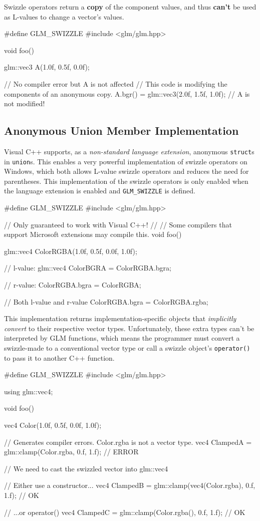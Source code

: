 \documentclass{scrartcl}
\numberwithin{figure}{subsection}
\begin{document}
Swizzle operators return a \textbf{copy} of the component values, and thus \textbf{can't} be used as L-values to change a vector's values.

\begin{cppcode}
#define GLM_SWIZZLE 
#include <glm/glm.hpp>

void foo()
{
  glm::vec3 A(1.0f, 0.5f, 0.0f);

  // No compiler error but A is not affected
  // This code is modifying the components of an anonymous copy.
  A.bgr() = glm::vec3(2.0f, 1.5f, 1.0f); // A is not modified!
}
\end{cppcode}


\subsection{Anonymous Union Member Implementation}

Visual C++ supports, as a \emph{non-standard language extension}, anonymous \verb|struct|s in \verb|union|s. This enables a very powerful implementation of swizzle operators on Windows, which both allows L-value swizzle operators and reduces the need for parentheses.  This implementation of the swizzle operators is only enabled when the language extension is enabled and \verb|GLM_SWIZZLE| is defined.

\begin{cppcode}
#define GLM_SWIZZLE 
#include <glm/glm.hpp>

// Only guaranteed to work with Visual C++!
//
// Some compilers that support Microsoft extensions may compile this.
void foo()
{
  glm::vec4 ColorRGBA(1.0f, 0.5f, 0.0f, 1.0f);

  // l-value:
  glm::vec4 ColorBGRA = ColorRGBA.bgra;

  // r-value:
  ColorRGBA.bgra = ColorRGBA;

  // Both l-value and r-value
  ColorRGBA.bgra = ColorRGBA.rgba;
}
\end{cppcode}

This implementation returns implementation-specific objects that \emph{implicitly convert} to their respective vector types.  Unfortunately, these extra types can't be interpreted by GLM functions, which means the programmer must convert a swizzle-made  to a conventional vector type or call a swizzle object's \verb|operator()| to pass it to another C++ function.

\begin{cppcode}
#define GLM_SWIZZLE 
#include <glm/glm.hpp>

using glm::vec4;

void foo()
{
  vec4 Color(1.0f, 0.5f, 0.0f, 1.0f);

  // Generates compiler errors. Color.rgba is not a vector type.
  vec4 ClampedA = glm::clamp(Color.rgba, 0.f, 1.f); // ERROR 

  // We need to cast the swizzled vector into glm::vec4

  // Either use a constructor...
  vec4 ClampedB = glm::clamp(vec4(Color.rgba), 0.f, 1.f); // OK

  // ...or operator()
  vec4 ClampedC = glm::clamp(Color.rgba(), 0.f, 1.f); // OK
}
\end{cppcode}
\end{document}
